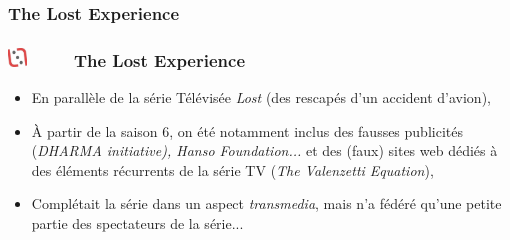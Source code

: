 \documentclass[slidetop,11pt]{beamer}
\def\sectionPartIIaIII{The Lost Experience}
\def\moreInFrameTitleLeftt{\includegraphics[height=0.5cm]{img/ligueludique-0.png}~~~~~}
\begin{document}
\subsubsection{\sectionPartIIaIII}
\begin{frame}
	\frametitle{\moreInFrameTitleLeftt \sectionPartIIaIII }
	\begin{itemize}
		\item En parall{\`e}le de la s{\'e}rie T{\'e}l{\'e}vis{\'e}e \emph{Lost} (des rescap{\'e}s d'un accident d'avion), 
		\item {\`A} partir de la saison 6, on {\'e}t{\'e} notamment inclus des fausses publicit{\'e}s (\emph{DHARMA initiative), \emph{Hanso Foundation}...} et des (faux) sites web d{\'e}di{\'e}s {\`a} des {\'e}l{\'e}ments r{\'e}currents de la s{\'e}rie TV (\emph{The Valenzetti Equation}), 
		\item Compl{\'e}tait la s{\'e}rie dans un aspect \emph{transmedia}, mais n'a f{\'e}d{\'e}r{\'e} qu'une petite partie des spectateurs de la s{\'e}rie...
	\end{itemize}
\end{frame} 
\end{document}
